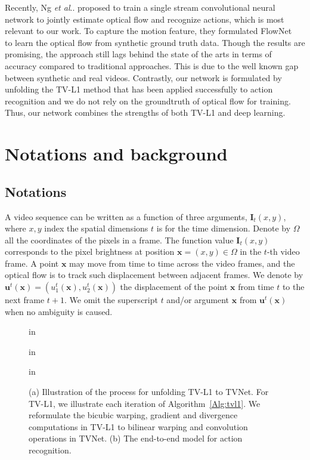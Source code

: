 \documentclass[10pt,twocolumn,letterpaper]{article}
\makeatletter
\DeclareRobustCommand\onedot{\futurelet\@let@token\@onedot}
\def\@onedot{\ifx\@let@token.\else.\null\fi\xspace}
\def\etal{\emph{et al}\onedot}
\def\Vec#1{{\boldsymbol{#1}}}
\def\Mat#1{{\boldsymbol{#1}}}
\makeatother
\begin{document}
Recently, Ng \etal \cite{ng2016actionflownet} proposed to train a single stream convolutional neural network to jointly estimate
optical flow and recognize actions, which is most relevant to our work. To capture the motion feature, they formulated FlowNet~\cite{fischer2015flownet} to learn the optical flow from synthetic
ground truth data. Though the results are promising, the approach still lags behind the state of the arts in terms of accuracy compared to traditional approaches. This is due to the well known gap between synthetic and real videos. Contrastly, our network is formulated by unfolding the TV-L1 method that has been applied successfully to action recognition and we do not rely on the groundtruth of optical flow for training. Thus, our network combines the strengths of both TV-L1 and deep learning.




 \section{Notations and background}


\subsection {Notations}
A video sequence can be written as a function of three arguments, $\Mat{I}_t(x,y)$, where $x,y$ index the spatial dimensions $t$ is for the time dimension. Denote by $\Omega$ all the coordinates of the pixels in a frame. The function value $\Mat{I}_t(x,y)$ corresponds to the pixel brightness at position $\Vec{x}=(x,y)\in\Omega$ in the $t$-th video frame. A point $\Vec{x}$ may move from time to time across the video frames, and the optical flow is to track such displacement between adjacent frames. We denote by $\Vec{u}^t(\Vec{x})=(u^t_1(\Vec{x}), u^t_2(\Vec{x}))$ the displacement of the point $\Vec{x}$ from time $t$ to the next frame $t+1$. We omit the superscript $t$ and/or argument $\Vec{x}$ from $\Vec{u}^t(\Vec{x})$ when no ambiguity is caused.


\begin{figure*}[!th]
 in
\begin{center}
 in
\caption{(a) Illustration of the process for unfolding TV-L1 to TVNet. For TV-L1, we illustrate each iteration of Algorithm~\ref{Alg:tvl1}. We reformulate the bicubic warping, gradient and divergence computations in TV-L1 to bilinear warping and convolution operations in TVNet. (b) The end-to-end model for action recognition. }
\label{Fig:tvnet}
\end{center}
 in
\end{figure*}
\end{document}
